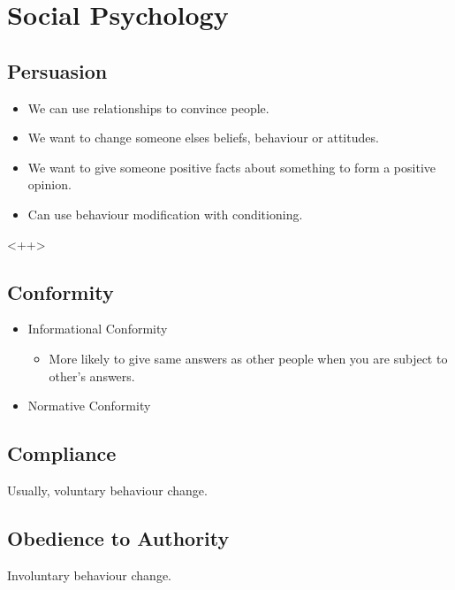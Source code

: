 \documentclass[12pt]{article}
\begin{document}
\section{Social Psychology}

\subsection{Persuasion}

\begin{itemize}
	\item We can use relationships to convince people.
	\item We want to change someone elses beliefs, behaviour or attitudes.
	\item We want to give someone positive facts about something to form a
		positive opinion.
	\item Can use behaviour modification with conditioning.
\end{itemize}<++>

\subsection{Conformity}

\begin{itemize}
	\item Informational Conformity
		\begin{itemize}
			\item More likely to give same answers as other people when you are subject
				to other's answers.
		\end{itemize}
	\item Normative Conformity
\end{itemize}

\subsection{Compliance}

Usually, voluntary behaviour change.

\subsection{Obedience to Authority}

Involuntary behaviour change.
\end{document}
